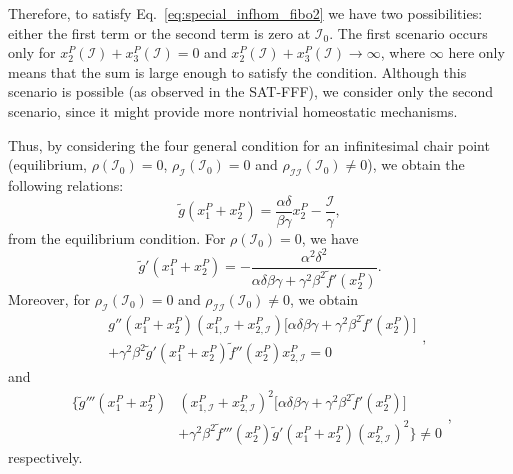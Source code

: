 Therefore, to satisfy Eq.~\ref{eq:special_infhom_fibo2} we have two possibilities: either 
the first term or the second term is zero at $\mathcal{I}_0$. The first scenario occurs only for 
$x_2^P(\mathcal{I}) + x_3^P(\mathcal{I}) = 0$ and
$x_2^P(\mathcal{I}) + x_3^P(\mathcal{I}) \rightarrow \infty$, where $\infty$ here only 
means that the sum is large enough to satisfy the condition.  Although this scenario is possible 
(as observed in the SAT-FFF), we consider only the second scenario, since it might 
provide more nontrivial homeostatic mechanisms.

Thus, by considering the four general condition for an infinitesimal chair point 
(equilibrium, $\rho(\mathcal{I}_0) = 0$, $\rho_{\mathcal{I}}(\mathcal{I}_0) = 0$ and 
$\rho_{\mathcal{II}}(\mathcal{I}_0) \neq 0$), we obtain the following relations:
\begin{equation}
    \tilde{g}(x_1^P + x_2^P) = \frac{\alpha\delta}{\beta\gamma}x_2^P - \frac{\mathcal{I}}{\gamma},
\end{equation}
from the equilibrium condition. For $\rho(\mathcal{I}_0) = 0$, we have 
\begin{equation}
    \tilde{g}'(x_1^P + x_2^P) = - \frac{\alpha^2\delta^2}{\alpha\delta\beta\gamma + \gamma^2\beta^2\tilde{f}'(x_2^P)}.
\end{equation}
Moreover, for $\rho_{\mathcal{I}}(\mathcal{I}_0) = 0$ and 
$\rho_{\mathcal{II}}(\mathcal{I}_0) \neq 0$, we obtain
\begin{equation} \label{eq:chair1-fibo-x2r}
    \begin{split} 
        &{g}''(x_1^P + x_2^P)(x_{1,\mathcal{I}}^P + x_{2,\mathcal{I}}^P) \bigg[ \alpha\delta\beta\gamma + \gamma^2\beta^2\tilde{f}'(x_2^P)\bigg] \\ 
        & + \gamma^2\beta^2\tilde{g}'(x_1^P + x_2^P)\tilde{f}''(x_2^P)x_{2,\mathcal{I}}^P = 0 
    \end{split},
\end{equation}
and
\begin{equation}
    \begin{split} 
        \bigg\{ \tilde{g}'''(x_1^P + x_2^P)&(x_{1,\mathcal{I}}^P + x_{2,\mathcal{I}}^P)^2 \Big[\alpha\delta\beta\gamma + \gamma^2\beta^2\tilde{f}'(x_2^P)\Big] \\ 
        & + \gamma^2\beta^2\tilde{f}'''(x_2^P)\tilde{g}'(x_1^P + x_2^P)(x_{2,\mathcal{I}}^P)^2 \bigg\} \neq 0 
    \end{split},
\end{equation}
respectively.

